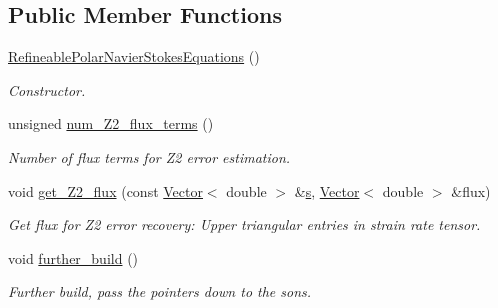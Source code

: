 \subsection*{Public Member Functions}
\begin{DoxyCompactItemize}
\item 
\hyperlink{classoomph_1_1RefineablePolarNavierStokesEquations_ad273d04dd7dce4cd6cae08c04982121f}{Refineable\+Polar\+Navier\+Stokes\+Equations} ()
\begin{DoxyCompactList}\small\item\em Constructor. \end{DoxyCompactList}\item 
unsigned \hyperlink{classoomph_1_1RefineablePolarNavierStokesEquations_a44c3c20fb5ac6268dfd7671d83695308}{num\+\_\+\+Z2\+\_\+flux\+\_\+terms} ()
\begin{DoxyCompactList}\small\item\em Number of \textquotesingle{}flux\textquotesingle{} terms for Z2 error estimation. \end{DoxyCompactList}\item 
void \hyperlink{classoomph_1_1RefineablePolarNavierStokesEquations_a80fc7aa35afb102162e12240f1f2f661}{get\+\_\+\+Z2\+\_\+flux} (const \hyperlink{classoomph_1_1Vector}{Vector}$<$ double $>$ \&\hyperlink{cfortran_8h_ab7123126e4885ef647dd9c6e3807a21c}{s}, \hyperlink{classoomph_1_1Vector}{Vector}$<$ double $>$ \&flux)
\begin{DoxyCompactList}\small\item\em Get \textquotesingle{}flux\textquotesingle{} for Z2 error recovery\+: Upper triangular entries in strain rate tensor. \end{DoxyCompactList}\item 
void \hyperlink{classoomph_1_1RefineablePolarNavierStokesEquations_ac75e1f0ff50368bd056a8d39c917e35b}{further\+\_\+build} ()
\begin{DoxyCompactList}\small\item\em Further build, pass the pointers down to the sons. \end{DoxyCompactList}\end{DoxyCompactItemize}
